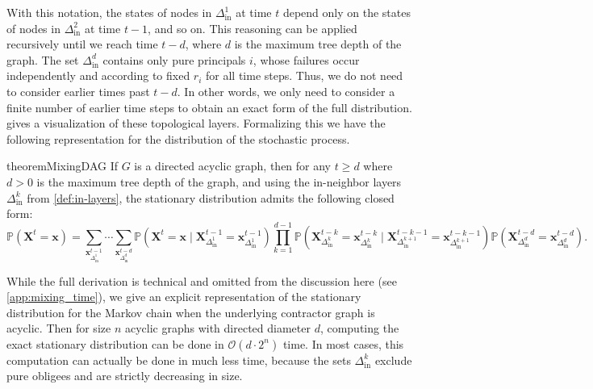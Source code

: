 \documentclass[mnsc,nonblindrev]{informs3}
\newcommand{\bigO}{\mathcal{O}}
\renewcommand{\Pr}{\mathbb{P}}
\newcommand{\Xvec}{\mathbf{X}}
\newcommand{\xvec}{\mathbf{x}}
\newcommand{\Deltain}{\Delta_{\text{in}}}
\begin{document}
With this notation, the states of nodes in $\Deltain^1$ at time $t$ depend only on the states of nodes in $\Deltain^2$ at time $t-1$, and so on. This reasoning can be applied recursively until we reach time $t-d$, where $d$ is the maximum tree depth of the graph. The set $\Deltain^d$ contains only pure principals $i$, whose failures occur independently and according to fixed $r_i$ for all time steps. Thus, we do not need to consider earlier times past $t-d$. In other words, we only need to consider a finite number of earlier time steps to obtain an exact form of the full distribution.  gives a visualization of these topological layers.  Formalizing this we have the following representation for the distribution of the stochastic process.
\begin{restatable}{theorem}{MixingDAG}
\label{thm:mix_dag}
    If $G$ is a directed acyclic graph, then for any $t \geq d$ where $d > 0$ is the maximum tree depth of the graph, and using the in-neighbor layers $\Deltain^k$ from \cref{def:in-layers}, the stationary distribution admits the following closed form: 
    \begin{equation*}
        \Pr(\Xvec^t=\xvec)
        = \sum_{\xvec^{t-1}_{\Deltain^1}} \cdots \sum_{\xvec^{t-d}_{\Deltain^d}}
\Pr(\Xvec^t=\xvec \mid \Xvec^{t-1}_{\Deltain^1}=\xvec^{t-1}_{\Deltain^1})
\prod_{k=1}^{d-1} \Pr(\Xvec^{t-k}_{\Deltain^k}=\xvec^{t-k}_{\Deltain^k} \mid \Xvec^{t-k-1}_{\Deltain^{k+1}}=\xvec^{t-k-1}_{\Deltain^{k+1}})
\Pr(\Xvec^{t-d}_{\Deltain^d}=\xvec_{\Deltain^d}^{t-d}).
    \end{equation*}
\end{restatable}


    While the full derivation is technical and omitted from the discussion here (see \cref{app:mixing_time}), we give an explicit representation of the stationary distribution for the Markov chain when the underlying contractor graph is acyclic.
    Then for size $n$ acyclic graphs with directed diameter $d$, computing the exact stationary distribution can be done in $\bigO(d\cdot2^n)$ time.
    In most cases, this computation can actually be done in much less time, because the sets $\Deltain^k$ exclude pure obligees and are strictly decreasing in size.
\end{document}
